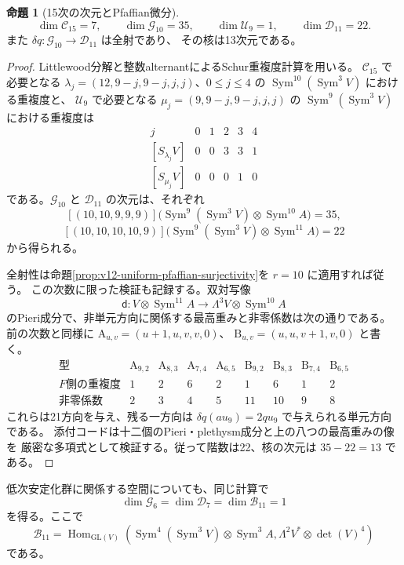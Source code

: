 \documentclass[a4paper,11pt]{ltjsarticle}
\theoremstyle{definition}
\newtheorem{proposition}[theorem]{命題}
\begin{document}
\begin{proposition}[15次の次元とPfaffian微分]
\label{prop:v12-fifteenth-characters}
\[
 \dim\mathcal C_{15}=7,\qquad
 \dim\mathcal G_{10}=35,\qquad
 \dim\mathcal U_9=1,\qquad
 \dim\mathcal D_{11}=22.
\]
また $\delta q:\mathcal G_{10}\to\mathcal D_{11}$ は全射であり、
その核は13次元である。
\end{proposition}
\begin{proof}
Littlewood分解と整数alternantによるSchur重複度計算を用いる。
$\mathcal C_{15}$ で必要となる
$\lambda_j=(12,9-j,9-j,j,j)$、$0\le j\le4$ の
$\operatorname{Sym}^{10}(\operatorname{Sym}^3V)$ における重複度と、
$\mathcal U_9$ で必要となる
$\mu_j=(9,9-j,9-j,j,j)$ の
$\operatorname{Sym}^{9}(\operatorname{Sym}^3V)$ における重複度は
\[
\begin{array}{c|rrrrr}
 j&0&1&2&3&4\\\hline
 {}[S_{\lambda_j}V]&0&0&3&3&1\\
 {}[S_{\mu_j}V]&0&0&0&1&0
\end{array}
\]
である。$\mathcal G_{10}$ と $\mathcal D_{11}$ の次元は、それぞれ
\[
 [(10,10,9,9,9)]
 \bigl(\operatorname{Sym}^{9}(\operatorname{Sym}^3V)
                  \otimes\operatorname{Sym}^{10}A\bigr)=35,
\]
\[
 [(10,10,10,10,9)]
 \bigl(\operatorname{Sym}^{9}(\operatorname{Sym}^3V)
                  \otimes\operatorname{Sym}^{11}A\bigr)=22
\]
から得られる。

全射性は命題\ref{prop:v12-uniform-pfaffian-surjectivity}を $r=10$ に適用すれば従う。
この次数に限った検証も記録する。双対写像
\[
 \mathsf d:V\otimes\operatorname{Sym}^{11}A
       \longrightarrow\Lambda^3V\otimes\operatorname{Sym}^{10}A
\]
のPieri成分で、非単元方向に関係する最高重みと非零係数は次の通りである。
前の次数と同様に
$\mathrm A_{u,v}=(u+1,u,v,v,0)$、
$\mathrm B_{u,v}=(u,u,v+1,v,0)$ と書く。
\[
\begin{array}{c|rrrr|rrrr}
 \text{型}&\mathrm A_{9,2}&\mathrm A_{8,3}&\mathrm A_{7,4}&\mathrm A_{6,5}
 &\mathrm B_{9,2}&\mathrm B_{8,3}&\mathrm B_{7,4}&\mathrm B_{6,5}\\\hline
 \text{$F$側の重複度}&1&2&6&2&1&6&1&2\\
 \text{非零係数}&2&3&4&5&11&10&9&8
\end{array}
\]
これらは21方向を与え、残る一方向は
$\delta q(au_9)=2qu_9$ で与えられる単元方向である。
添付コードは十二個のPieri・plethysm成分と上の八つの最高重みの像を
厳密な多項式として検証する。従って階数は22、核の次元は $35-22=13$ である。
\end{proof}

低次安定化群に関係する空間についても、同じ計算で
\[
 \dim\mathcal G_6=\dim\mathcal D_7=\dim\mathcal B_{11}=1
\]
を得る。ここで
\[
 \mathcal B_{11}
 =\operatorname{Hom}_{\mathrm{GL}(V)}
 \left(\operatorname{Sym}^{4}(\operatorname{Sym}^3V)
       \otimes\operatorname{Sym}^{3}A,
       \Lambda^2V^*\otimes\det(V)^4\right)
\]
である。
\end{document}
